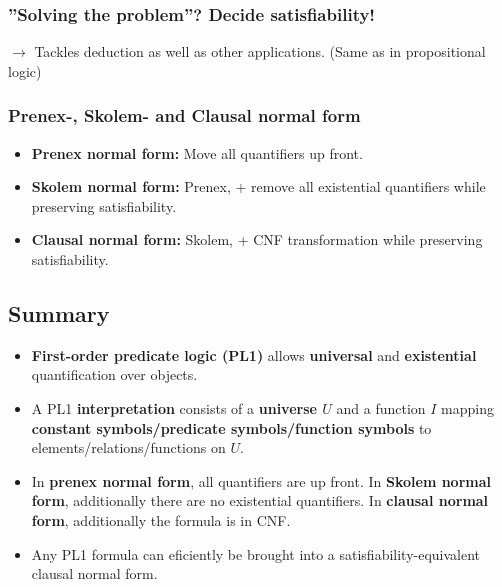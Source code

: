 \documentclass[conference, a4paper]{styles/acmsiggraph}
\begin{document}
        \subsubsection{''Solving the problem''? Decide satisfiability!}
            $\rightarrow$ Tackles deduction as well as other applications. (Same as in propositional logic)

        \subsubsection{Prenex-, Skolem- and Clausal normal form}
            \begin{itemize}
                \item \textbf{Prenex normal form:} Move all quantifiers up front.
                \item \textbf{Skolem normal form:} Prenex, + remove all existential quantifiers while preserving satisfiability.
                \item \textbf{Clausal normal form:} Skolem, + CNF transformation while preserving satisfiability.
            \end{itemize}
        
    \subsection{Summary}
        \begin{itemize}
            \item \textbf{First-order predicate logic (PL1)} allows \textbf{universal} and \textbf{existential} quantification over objects.
            \item A PL1 \textbf{interpretation} consists of a \textbf{universe $U$} and a function $I$ mapping \textbf{constant symbols/predicate symbols/function symbols} to elements/relations/functions on $U$.
            \item In \textbf{prenex normal form}, all quantifiers are up front. In \textbf{Skolem normal form}, additionally there are no existential quantifiers. In \textbf{clausal normal form}, additionally the formula is in CNF.
            \item Any PL1 formula can eficiently be brought into a satisfiability-equivalent clausal normal form.
        \end{itemize}
    
    
    
    
    
    
    
\end{document}
